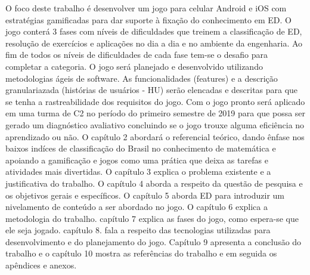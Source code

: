 O foco deste trabalho é desenvolver um jogo para celular Android e iOS com estratégias gamificadas para dar suporte à fixação do conhecimento em ED.
O jogo conterá 3 fases com níveis de dificuldades que treinem a classificação de ED, resolução de exercícios e aplicações no dia a dia e no ambiente da engenharia. Ao fim de todos os níveis de dificuldades de cada fase tem-se o desafio para completar a categoria.
O jogo será planejado e desenvolvido utilizando metodologias ágeis de software. As funcionalidades (features) e a descrição granulariazada (histórias de usuários - HU) serão elencadas e descritas para que se tenha a rastreabilidade dos requisitos do jogo. Com o jogo pronto será aplicado em uma turma de C2 no período do primeiro semestre de 2019 para que possa ser gerado um diagnóstico avaliativo concluindo se o jogo trouxe alguma eficiência no aprendizado ou não.
O capítulo 2 abordará o referencial teórico, dando ênfase nos baixos indíces de classificação do Brasil no conhecimento de matemática e apoiando a gamificação e jogos como uma prática que deixa as tarefas e atividades mais divertidas.
O capítulo 3 explica o problema existente e a justificativa do trabalho. O capítulo 4 aborda a respeito da questão de pesquisa e os objetivos gerais e específicos. O capítulo 5 aborda ED para introduzir um nivelamento de conteúdo a ser abordado no jogo. O capítulo 6 explica a metodologia do trabalho. capítulo 7 explica as fases do jogo, como espera-se que ele seja jogado. capítulo 8. fala a respeito das tecnologias utilizadas para desenvolvimento e do planejamento do jogo. Capítulo 9 apresenta a conclusão do trabalho e o capítulo 10 mostra as referências do trabalho e em seguida os apêndices e anexos.


\begin{comment}
O aplicativo deverá ser um jogo com estratégias gamificadas para o ensino de aplicações e práticas do conteúdo de equação diferencial ordinária (EDO) de primeira ordem aos alunos do ensino superior com TDAH. 
\end{comment}
